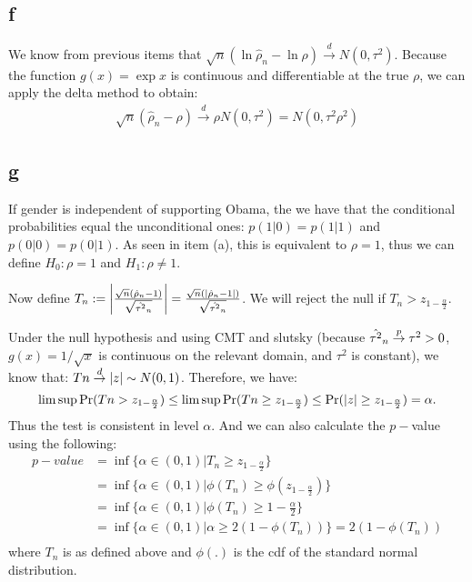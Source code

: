 \documentclass[12pt]{paper}
\begin{document}
\subsection*{f}

We know from previous items that $\sqrt{n}(\ln{\hat{\rho}_n}-\ln{\rho})\overset{d}{\to}N(0,\tau^2)$. Because the function $g(x)=\exp{x}$ is continuous and differentiable at the true $\rho$, we can apply the delta method to obtain:
\begin{equation}
\begin{split}
\sqrt{n}(\hat{\rho}_n-\rho)\overset{d}{\to}\rho N(0,\tau^2)=N(0,\tau^2\rho^2)
\end{split}
\end{equation}

\subsection*{g}

If gender is independent of supporting Obama, the we have that the conditional probabilities equal the unconditional ones: $p(1|0)=p(1|1)$ and $p(0|0)=p(0|1)$. As seen in item (a), this is equivalent to $\rho=1$, thus we can define $H_0: \rho=1$ and $H_1:\rho\ne 1$.

Now define $T_n:= \left \lvert \frac{\sqrt{n}(\hat{\rho}_n-1)}{\sqrt{\hat{\tau^2}_n}} \right \rvert=\frac{\sqrt{n}(\left \lvert \hat{\rho}_n-1 \right \rvert)}{\sqrt{\hat{\tau^2}_n}}$. We will reject the null if $T_n>z_{1-\frac{\alpha}{2}}$.

Under the null hypothesis and using CMT and slutsky (because $\hat{\tau^2}_n\overset{p}{\to} \tau^2>0$, $g(x)=1/\sqrt{x}$ is continuous on the relevant domain, and $\tau^2$ is constant), we know that: $Tn\overset{d}{\to}\left \lvert z \right \rvert\sim N(0,1)$. Therefore, we have:
\begin{equation}
 \limsup{\Pr(Tn> z_{1-\frac{\alpha}{2}})}\le \limsup{\Pr(Tn\ge z_{1-\frac{\alpha}{2}})}\le \Pr(\left \lvert z \right \rvert\ge z_{1-\frac{\alpha}{2}})=\alpha.
\end{equation}
\noindent Thus the test is consistent in level $\alpha$. And we can also calculate the $p-$value using the following:
\begin{equation}
\begin{split}
p-value&=\inf{\{\alpha\in(0,1)|T_n\ge z_{1-\frac{\alpha}{2}}\}}\\
&=\inf{\{\alpha\in(0,1)|\phi(T_n)\ge \phi(z_{1-\frac{\alpha}{2}})\}}\\
&=\inf{\{\alpha\in(0,1)|\phi(T_n)\ge 1-\frac{\alpha}{2}\}}\\
&=\inf{\{\alpha\in(0,1)|\alpha\ge 2(1-\phi(T_n))\}}=2(1-\phi(T_n))\\
\end{split}
\end{equation}
\noindent where $T_n$ is as defined above and $\phi(.)$ is the cdf of the standard normal distribution.
\end{document}
